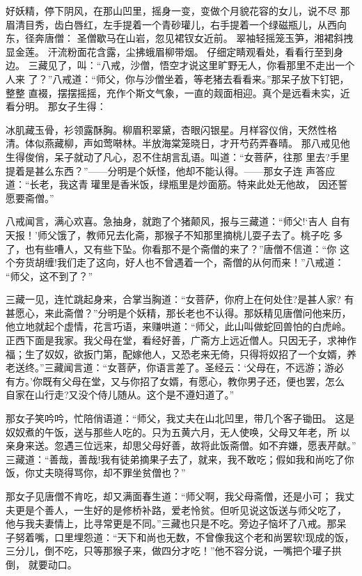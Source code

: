 好妖精，停下阴风，在那山凹里，摇身一变，变做个月貌花容的女儿，说不尽
那眉清目秀，齿白唇红，左手提着一个青砂瓘儿，右手提着一个绿磁瓶儿，从西向
东，径奔唐僧：
圣僧歇马在山岩，忽见裙钗女近前。
翠袖轻摇笼玉笋，湘裙斜拽显金莲。
汗流粉面花含露，尘拂蛾眉柳带烟。
仔细定睛观看处，看看行至到身边。
三藏见了，叫：“八戒，沙僧，悟空才说这里旷野无人，你看那里不走出一个人来
了？”八戒道：“师父，你与沙僧坐着，等老猪去看看来。”那呆子放下钉钯，整整
直裰，摆摆摇摇，充作个斯文气象，一直的觌面相迎。真个是远看未实，近看分明。
那女子生得：

冰肌藏玉骨，衫领露酥胸。柳眉积翠黛，杏眼闪银星。月样容仪俏，天然性格
清。体似燕藏柳，声如莺啭林。半放海棠笼晓日，才开芍药弄春晴。
那八戒见他生得俊俏，呆子就动了凡心，忍不住胡言乱语。叫道：“女菩萨，往那
里去?手里提着是甚么东西？”——分明是个妖怪，他却不能认得。——那女子连
声答应道：“长老，我这青瓘里是香米饭，绿瓶里是炒面筋。特来此处无他故，
因还誓愿要斋僧。”

八戒闻言，满心欢喜。急抽身，就跑了个猪颠风，报与三藏道：“师父!‘吉人
自有天报！’师父饿了，教师兄去化斋，那猴子不知那里摘桃儿耍子去了。桃子吃
多了，也有些嘈人，又有些下坠。你看那不是个斋僧的来了？”唐僧不信道：“你
这个夯货胡缠!我们走了这向，好人也不曾遇着一个，斋僧的从何而来！”八戒道：
“师父，这不到了？”

三藏一见，连忙跳起身来，合掌当胸道：“女菩萨，你府上在何处住?是甚人家?
有甚愿心，来此斋僧？”分明是个妖精，那长老也不认得。那妖精见唐僧问他来历，
他立地就起个虚情，花言巧语，来赚哄道：“师父，此山叫做蛇回兽怕的白虎岭。
正西下面是我家。我父母在堂，看经好善，广斋方上远近僧人。只因无子，求神作
福；生了奴奴，欲扳门第，配嫁他人，又恐老来无倚，只得将奴招了一个女婿，养
老送终。”三藏闻言道：“女菩萨，你语言差了。圣经云：‘父母在，不远游；游必
有方。’你既有父母在堂，又与你招了女婿，有愿心，教你男子还，便也罢，怎么
自家在山行走?又没个侍儿随从。这个是不遵妇道了。”

那女子笑吟吟，忙陪俏语道：“师父，我丈夫在山北凹里，带几个客子锄田。
这是奴奴煮的午饭，送与那些人吃的。只为五黄六月，无人使唤，父母又年老，所
以亲身来送。忽遇三位远来，却思父母好善，故将此饭斋僧。如不弃嫌，愿表芹献。”
三藏道：“善哉，善哉!我有徒弟摘果子去了，就来，我不敢吃；假如我和尚吃了你
饭，你丈夫晓得骂你，却不罪坐贫僧也？”

那女子见唐僧不肯吃，却又满面春生道：“师父啊，我父母斋僧，还是小可；
我丈夫更是个善人，一生好的是修桥补路，爱老怜贫。但听见说这饭送与师父吃了，
他与我夫妻情上，比寻常更是不同。”三藏也只是不吃。旁边子恼坏了八戒。那呆
子努着嘴，口里埋怨道：“天下和尚也无数，不曾像我这个老和尚罢软!现成的饭，
三分儿，倒不吃，只等那猴子来，做四分才吃！”他不容分说，一嘴把个瓘子拱倒，
就要动口。

